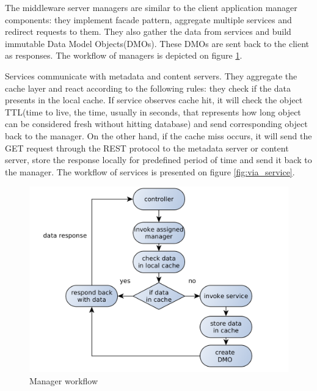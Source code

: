 The middleware server managers are similar to the client application manager components: they implement facade pattern, aggregate multiple services and redirect requests to them. They also gather the data from services and build immutable Data Model Objects(DMOs). These DMOs are sent back to the client as responses. The workflow of managers is depicted on figure \ref{fig:via_manager}.

Services communicate with metadata and content servers. They aggregate the cache layer and react according to the following rules: they check if the data presents in the local cache. If service observes cache hit, it will check the object TTL(time to live, the time, usually in seconds, that represents how long object can be considered fresh without hitting database) and send corresponding object back to the manager. On the other hand, if the cache miss occurs, it will send the GET request through the REST protocol to the metadata server or content server, store the response locally for predefined period of time and send it back to the manager. The workflow of services is presented on figure \ref{fig:via_service}.


\begin{figure}[h]
    \centering
	\includegraphics[width=\textwidth]{images/via_manager_1.png}
    \caption{Manager workflow}
    \label{fig:via_manager}
\end{figure}

